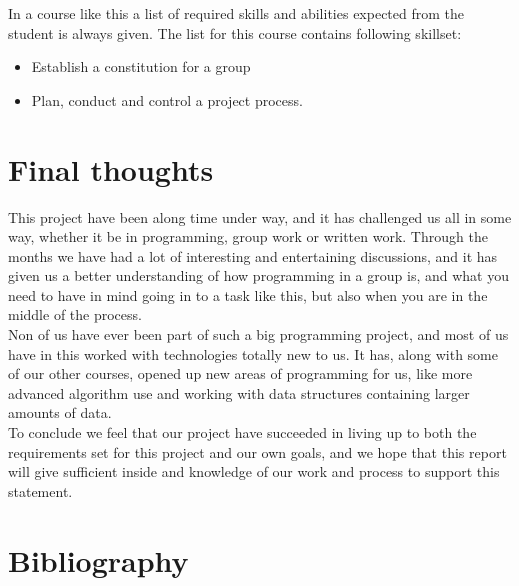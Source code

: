 \documentclass[a4paper,10pt,titlepage]{article}
\begin{document}
In a course like this a list of required skills and abilities expected from the student is always given. The list for this course contains following skillset:
\begin{itemize}
	\item Establish a constitution for a group
	\item Plan, conduct and control a project process.
	 
	
\end{itemize} 

	\newpage
	
	\section{Final thoughts}
	This project have been along time under way, and it has challenged us all in some way, whether it be in programming, group work or written work. Through the months we have had a lot of interesting and entertaining discussions, and it has given us a better understanding of how programming in a group is, and what you need to have in mind going in to a task like this, but also when you are in the middle of the process.\\

Non of us have ever been part of such a big programming project, and most of us have in this worked with technologies totally new to us. It has, along with some of our other courses, opened up new areas of programming for us, like more advanced algorithm use and working with data structures containing larger amounts of data.\\

To conclude we feel that our project have succeeded in living up to both the requirements set for this project and our own goals, and we hope that this report will give sufficient inside and knowledge of our work and process to support this statement.\\
	
	\newpage	
	
	\section{Bibliography}
	
\end{document}
